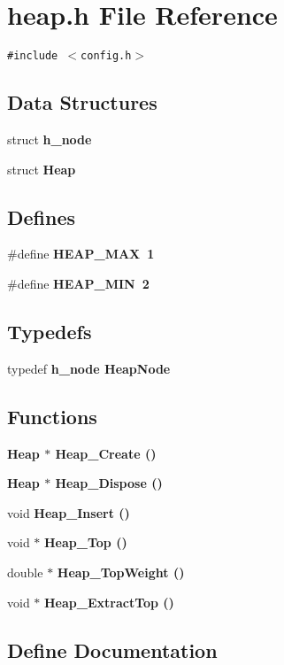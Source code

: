 \section{heap.h File Reference}
\label{heap_8h}
{\tt \#include $<$config.h$>$}\par
\subsection*{Data Structures}
\begin{CompactItemize}
\item 
struct \bf{h\_\-node}
\item 
struct \bf{Heap}
\end{CompactItemize}
\subsection*{Defines}
\begin{CompactItemize}
\item 
\#define \bf{HEAP\_\-MAX}~1
\item 
\#define \bf{HEAP\_\-MIN}~2
\end{CompactItemize}
\subsection*{Typedefs}
\begin{CompactItemize}
\item 
typedef \bf{h\_\-node} \bf{Heap\-Node}
\end{CompactItemize}
\subsection*{Functions}
\begin{CompactItemize}
\item 
\bf{Heap} $\ast$ \bf{Heap\_\-Create} ()
\item 
\bf{Heap} $\ast$ \bf{Heap\_\-Dispose} ()
\item 
void \bf{Heap\_\-Insert} ()
\item 
void $\ast$ \bf{Heap\_\-Top} ()
\item 
double $\ast$ \bf{Heap\_\-Top\-Weight} ()
\item 
void $\ast$ \bf{Heap\_\-Extract\-Top} ()
\end{CompactItemize}


\subsection{Define Documentation}
